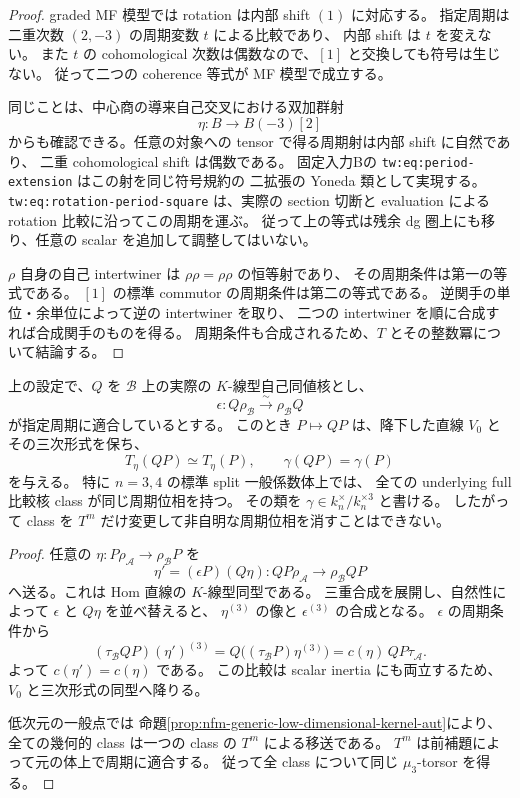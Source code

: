 \begin{proof}
graded MF 模型では rotation は内部 shift $(1)$ に対応する。
指定周期は二重次数 $(2,-3)$ の周期変数 $t$ による比較であり、
内部 shift は $t$ を変えない。
また $t$ の cohomological 次数は偶数なので、$[1]$ と交換しても符号は生じない。
従って二つの coherence 等式が MF 模型で成立する。

同じことは、中心商の導来自己交叉における双加群射
\[
 \eta:B\longrightarrow B(-3)[2]
\]
からも確認できる。任意の対象への tensor で得る周期射は内部 shift に自然であり、
二重 cohomological shift は偶数である。
固定入力Bの \texttt{tw:eq:period-extension} はこの射を同じ符号規約の
二拡張の Yoneda 類として実現する。
\texttt{tw:eq:rotation-period-square} は、実際の section 切断と evaluation による
rotation 比較に沿ってこの周期を運ぶ。
従って上の等式は残余 dg 圏上にも移り、任意の scalar を追加して調整してはいない。

$\rho$ 自身の自己 intertwiner は $\rho\rho=\rho\rho$ の恒等射であり、
その周期条件は第一の等式である。
$[1]$ の標準 commutor の周期条件は第二の等式である。
逆関手の単位・余単位によって逆の intertwiner を取り、
二つの intertwiner を順に合成すれば合成関手のものを得る。
周期条件も合成されるため、$T$ とその整数冪について結論する。
\end{proof}

\begin{proposition}
\label{prop:nfm-period-phase-class-invariance}
上の設定で、$Q$ を $\mathcal B$ 上の実際の $K$-線型自己同値核とし、
\[
 \epsilon:Q\rho_{\mathcal B}\xrightarrow{\sim}\rho_{\mathcal B}Q
\]
が指定周期に適合しているとする。
このとき $P\mapsto QP$ は、降下した直線 $V_0$ とその三次形式を保ち、
\[
 T_\eta(QP)\simeq T_\eta(P),\qquad
 \gamma(QP)=\gamma(P)
\]
を与える。
特に $n=3,4$ の標準 split 一般係数体上では、
全ての underlying full 比較核 class が同じ周期位相を持つ。
その類を $\gamma\in k_n^\times/k_n^{\times3}$ と書ける。
したがって class を $T^m$ だけ変更して非自明な周期位相を消すことはできない。
\end{proposition}

\begin{proof}
任意の $\eta:P\rho_{\mathcal A}\to\rho_{\mathcal B}P$ を
\[
 \eta'=(\epsilon P)(Q\eta):QP\rho_{\mathcal A}
                         \longrightarrow\rho_{\mathcal B}QP
\]
へ送る。これは Hom 直線の $K$-線型同型である。
三重合成を展開し、自然性によって $\epsilon$ と $Q\eta$ を並べ替えると、
$\eta^{(3)}$ の像と $\epsilon^{(3)}$ の合成となる。
$\epsilon$ の周期条件から
\[
 (\tau_{\mathcal B}QP)(\eta')^{(3)}
   =Q\bigl((\tau_{\mathcal B}P)\eta^{(3)}\bigr)
   =c(\eta)\,QP\tau_{\mathcal A}.
\]
よって $c(\eta')=c(\eta)$ である。
この比較は scalar inertia にも両立するため、$V_0$ と三次形式の同型へ降りる。

低次元の一般点では
命題\ref{prop:nfm-generic-low-dimensional-kernel-aut}により、
全ての幾何的 class は一つの class の $T^m$ による移送である。
$T^m$ は前補題によって元の体上で周期に適合する。
従って全 class について同じ $\mu_3$-torsor を得る。
\end{proof}

